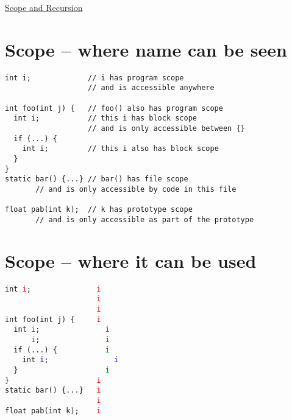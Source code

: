 \documentclass{article}
\begin{document}
\begin{center}
	\underline{\huge Scope and Recursion}
\end{center}




\section{Scope -- where name can be seen}
\begin{verbatim}
int i;             // i has program scope
                   // and is accessible anywhere

int foo(int j) {   // foo() also has program scope
  int i;           // this i has block scope
                   // and is only accessible between {}
  if (...) {
    int i;         // this i also has block scope
  }
}
static bar() {...} // bar() has file scope
       // and is only accessible by code in this file

float pab(int k);  // k has prototype scope
       // and is only accessible as part of the prototype
\end{verbatim}



\section{Scope -- where it can be used}

\verb!int !\textcolor{red}{\texttt{i}}\verb!;               !\textcolor{red}{\texttt{i}}\\
\verb!                     !\textcolor{red}{\texttt{i}}\\
\verb!                     !\textcolor{red}{\texttt{i}}\\
\verb!int foo(int j) {     !\textcolor{red}{\texttt{i}}\\
\verb!  int !\textcolor{green}{\texttt{i}}\verb!;               !\textcolor{green}{\texttt{i}}\\
\verb!      !\textcolor{green}{\texttt{i}}\verb!;               !\textcolor{green}{\texttt{i}}\\[\baselineskip]
\verb!  if (...) {           !\textcolor{green}{\texttt{i}}\\
\verb!    int !\textcolor{blue}{\texttt{i}}\verb!;               !\textcolor{blue}{\texttt{i}}\\
\verb!  }                    !\textcolor{green}{\texttt{i}}\\
\verb!}                    !\textcolor{red}{\texttt{i}}\\
\verb!static bar() {...}   !\textcolor{red}{\texttt{i}}\\
\verb!                     !\textcolor{red}{\texttt{i}}\\
\verb!float pab(int k);    !\textcolor{red}{\texttt{i}}
\end{document}
